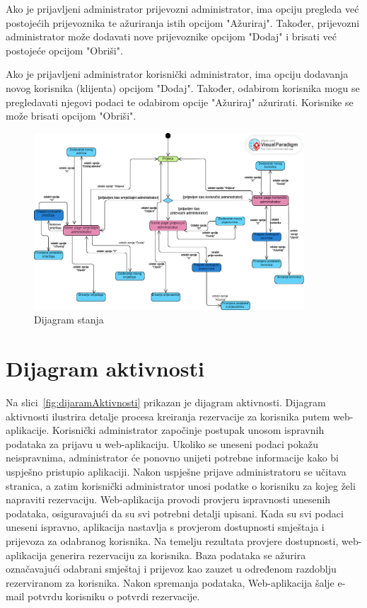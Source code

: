 			Ako je prijavljeni administrator prijevozni administrator, ima opciju pregleda već postojećih prijevoznika te ažuriranja istih opcijom "Ažuriraj". Također, prijevozni administrator može dodavati nove prijevoznike opcijom "Dodaj" i brisati već postojeće opcijom "Obriši".
			
			Ako je prijavljeni administrator korisnički administrator, ima opciju dodavanja novog korisnika (klijenta) opcijom "Dodaj". Također, odabirom korisnika mogu se pregledavati njegovi podaci te odabirom opcije "Ažuriraj" ažurirati. Korisnike se može brisati opcijom "Obriši".
			
			\begin{figure}[htbp]
				\centering
				\includegraphics[width=0.9\textwidth]{dijagrami/dijagramStanja.png}
				\caption{Dijagram stanja}
				\label{fig:dijagramStanja}
			\end{figure}
			
			
			\eject 
			\clearpage
			
		\section{Dijagram aktivnosti}
		
				Na slici~\ref{fig:dijaramAktivnosti} prikazan je dijagram aktivnosti. Dijagram aktivnosti ilustrira detalje procesa kreiranja rezervacije za korisnika putem web-aplikacije. Korisnički administrator započinje postupak unosom ispravnih podataka za prijavu u web-aplikaciju. Ukoliko se uneseni podaci pokažu neispravnima, administrator će ponovno unijeti potrebne informacije kako bi uspješno pristupio aplikaciji.
				Nakon uspješne prijave administratoru se učitava stranica, a zatim korisnički administrator unosi podatke o korisniku za kojeg želi napraviti rezervaciju. Web-aplikacija provodi provjeru ispravnosti unesenih podataka, osiguravajući da su svi potrebni detalji upisani. Kada su svi podaci uneseni ispravno, aplikacija nastavlja s provjerom dostupnosti smještaja i prijevoza za odabranog korisnika. Na temelju rezultata provjere dostupnosti, web-aplikacija generira rezervaciju za korisnika. Baza podataka se ažurira označavajući odabrani smještaj i prijevoz kao zauzet u određenom razdoblju rezerviranom za korisnika. Nakon spremanja podataka, Web-aplikacija šalje e-mail potvrdu korisniku o potvrdi rezervacije.
			 
